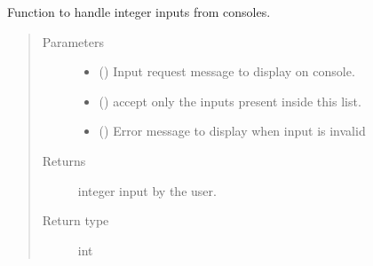 \documentclass[letterpaper,10pt,english,openany,oneside]{sphinxmanual}
\begin{document}

\begin{fulllineitems}
\label{\detokenize{docs/source/common:common.input_handler.get_input_int}}
Function to handle integer inputs from consoles.
\begin{quote}\begin{description}
\item[{Parameters}] \leavevmode\begin{itemize}
\item {} 
 () \textendash{} Input request message to display on console.

\item {} 
 () \textendash{} accept only the inputs present inside this list.

\item {} 
 () \textendash{} Error message to display when input is invalid

\end{itemize}

\item[{Returns}] \leavevmode
integer input by the user.

\item[{Return type}] \leavevmode
int

\end{description}\end{quote}

\end{fulllineitems}

\end{document}
